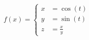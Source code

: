 \documentclass[nofonts]{ctexart}
\begin{document}

\left
$$ f(x)=\left\{
\begin{aligned}
x & =\cos(t) \\
y & =\sin(t) \\
z & =\frac xy
\end{aligned}
\right. %
$$
\end{document}
